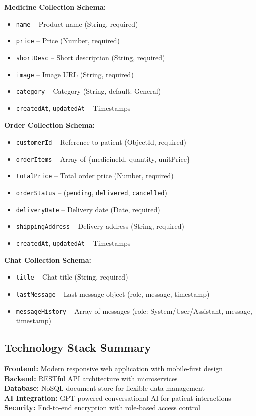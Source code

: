 \documentclass[12pt]{article}
\begin{document}
\textbf{Medicine Collection Schema:}
\begin{itemize}[leftmargin=1cm]
    \item \texttt{name} -- Product name (String, required)
    \item \texttt{price} -- Price (Number, required)
    \item \texttt{shortDesc} -- Short description (String, required)
    \item \texttt{image} -- Image URL (String, required)
    \item \texttt{category} -- Category (String, default: General)
    \item \texttt{createdAt}, \texttt{updatedAt} -- Timestamps
\end{itemize}

\textbf{Order Collection Schema:}
\begin{itemize}[leftmargin=1cm]
    \item \texttt{customerId} -- Reference to patient (ObjectId, required)
    \item \texttt{orderItems} -- Array of \{medicineId, quantity, unitPrice\}
    \item \texttt{totalPrice} -- Total order price (Number, required)
    \item \texttt{orderStatus} -- (\texttt{pending}, \texttt{delivered}, \texttt{cancelled})
    \item \texttt{deliveryDate} -- Delivery date (Date, required)
    \item \texttt{shippingAddress} -- Delivery address (String, required)
    \item \texttt{createdAt}, \texttt{updatedAt} -- Timestamps
\end{itemize}

\textbf{Chat Collection Schema:}
\begin{itemize}[leftmargin=1cm]
    \item \texttt{title} -- Chat title (String, required)
    \item \texttt{lastMessage} -- Last message object (role, message, timestamp)
    \item \texttt{messageHistory} -- Array of messages (role: System/User/Assistant, message, timestamp)
\end{itemize}

\vspace{1cm}
\begin{infobox}
\section*{Technology Stack Summary}
\textbf{Frontend:} Modern responsive web application with mobile-first design\\
\textbf{Backend:} RESTful API architecture with microservices\\
\textbf{Database:} NoSQL document store for flexible data management\\
\textbf{AI Integration:} GPT-powered conversational AI for patient interactions\\
\textbf{Security:} End-to-end encryption with role-based access control
\vspace{0.3cm}
\end{infobox}
\end{document}
